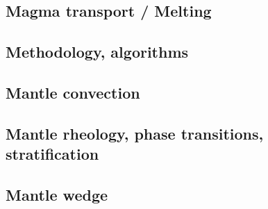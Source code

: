 \subsection*{Magma transport / Melting}

\cite{yatd12}
\cite{lorg18}

\subsection*{Methodology, algorithms}

\cite{leka93}

\subsection*{Mantle convection}

\cite{hemw75}
\cite{mahz78}
\cite{ludt79}
\cite{olco80}\cite{jamc80}
\cite{jape82}\cite{homc82}
\cite{hous83}\cite{hous83b}
\cite{olyb84}\cite{jarv84}\cite{haeb84}\cite{harp84}\cite{davi84}
\cite{jarv85}
\cite{davi86}
\cite{yuqh87}
\cite{zhch93}\cite{jarv93}\cite{tack93}
\cite{haeb94}
\cite{zhgu95}
\cite{zhyu96}\cite{hond96}\cite{rytr96a}\cite{rytr96b}\cite{tack96}\cite{trbo96}
\cite{hond97}\cite{iwho97}
\cite{ande98}\cite{iwho98}\cite{devv98}\cite{tack98}\cite{tack98b}\cite{trha98b}\cite{trha98}
\cite{duyr99}
\cite{albe00}\cite{hayu00}\cite{devv00b}\cite{tack00b}\cite{zhzm00}
\cite{tasu02}
\cite{hapa03}
\cite{taxn05}
\cite{nake07}
\cite{tack08}
\cite{wodd09}
\cite{lowm11}\cite{rota11}\cite{woda11}
\cite{holj13}\cite{dadb13}\cite{toyd13}
\cite{arfw14}\cite{helo14}
\cite{thkp15}

\subsection*{Mantle rheology, phase transitions, stratification}

\cite{yusb82}
\cite{zhyh92}
\cite{tasg93}
\cite{zhyu95}
\cite{pazw07}
\cite{java11}
\cite{tack12}

\subsection*{Mantle wedge}

\cite{tosl78}
\cite{leki09}
\cite{roms10}
\cite{ledg14}

